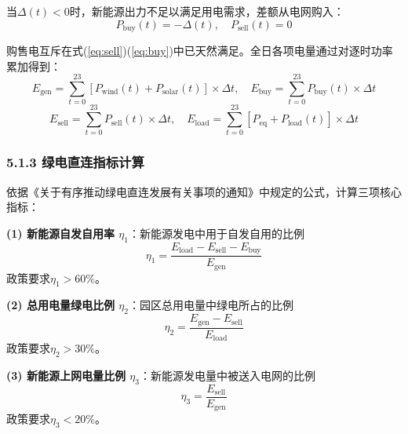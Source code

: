 \documentclass[zihao=-4,a4paper]{ctexart} %
\begin{document}
	当$\Delta(t) < 0$时，新能源出力不足以满足用电需求，差额从电网购入：
	\begin{equation}
		P_{\text{buy}}(t) = -\Delta(t),\quad P_{\text{sell}}(t) = 0
		\label{eq:buy}
	\end{equation}
	
	购售电互斥在式(\ref{eq:sell})(\ref{eq:buy})中已天然满足。全日各项电量通过对逐时功率累加得到：
	\begin{equation}
		E_{\text{gen}} = \sum_{t=0}^{23} \left[P_{\text{wind}}(t) + P_{\text{solar}}(t)\right] \times \Delta t,\quad
		E_{\text{buy}} = \sum_{t=0}^{23} P_{\text{buy}}(t) \times \Delta t
		\label{eq:energy}
	\end{equation}
	\begin{equation}
		E_{\text{sell}} = \sum_{t=0}^{23} P_{\text{sell}}(t) \times \Delta t,\quad
		E_{\text{load}} = \sum_{t=0}^{23} \left[P_{\text{eq}} + P_{\text{load}}(t)\right] \times \Delta t
		\label{eq:energy2}
	\end{equation}
	\subsubsection*{5.1.3 绿电直连指标计算}
	依据《关于有序推动绿电直连发展有关事项的通知》中规定的公式，计算三项核心指标：
	\par\textbf{(1) 新能源自发自用率 $\eta_1$}：新能源发电中用于自发自用的比例
	\begin{equation}
		\eta_1 = \frac{E_{\text{load}} - E_{\text{sell}} - E_{\text{buy}}}{E_{\text{gen}}}
		\label{eq:eta1}
	\end{equation}
	政策要求$\eta_1 > 60\%$。
	\par\textbf{(2) 总用电量绿电比例 $\eta_2$}：园区总用电量中绿电所占的比例
	\begin{equation}
		\eta_2 = \frac{E_{\text{gen}} - E_{\text{sell}}}{E_{\text{load}}}
		\label{eq:eta2}
	\end{equation}
	政策要求$\eta_2 > 30\%$。
	\par\textbf{(3) 新能源上网电量比例 $\eta_3$}：新能源发电量中被送入电网的比例
	\begin{equation}
		\eta_3 = \frac{E_{\text{sell}}}{E_{\text{gen}}}
		\label{eq:eta3}
	\end{equation}
	政策要求$\eta_3 < 20\%$。
\end{document}
